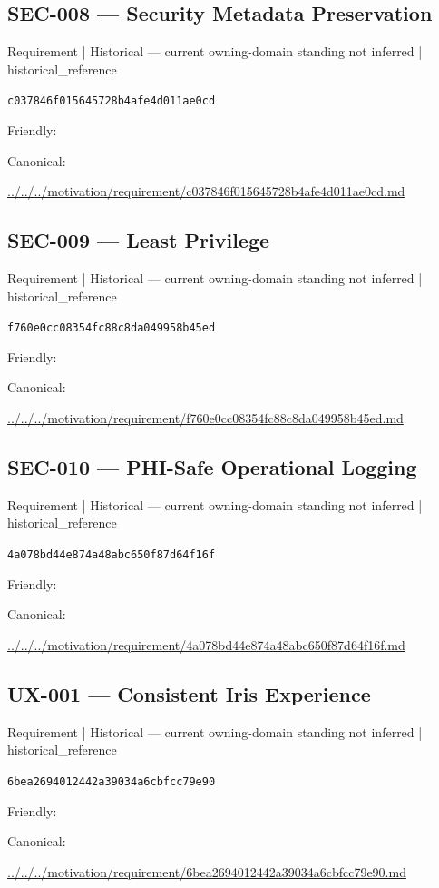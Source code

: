 \documentclass[10pt,a4paper]{article}
\begin{document}
\subsection*{SEC-008 — Security Metadata Preservation}
{\small Requirement | Historical — current owning-domain standing not inferred | historical\_reference}\par
\texttt{c037846f015645728b4afe4d011ae0cd}\par
Friendly: \par
Canonical: \par
{\footnotesize\url{../../../motivation/requirement/c037846f015645728b4afe4d011ae0cd.md}}\par
\subsection*{SEC-009 — Least Privilege}
{\small Requirement | Historical — current owning-domain standing not inferred | historical\_reference}\par
\texttt{f760e0cc08354fc88c8da049958b45ed}\par
Friendly: \par
Canonical: \par
{\footnotesize\url{../../../motivation/requirement/f760e0cc08354fc88c8da049958b45ed.md}}\par
\subsection*{SEC-010 — PHI-Safe Operational Logging}
{\small Requirement | Historical — current owning-domain standing not inferred | historical\_reference}\par
\texttt{4a078bd44e874a48abc650f87d64f16f}\par
Friendly: \par
Canonical: \par
{\footnotesize\url{../../../motivation/requirement/4a078bd44e874a48abc650f87d64f16f.md}}\par
\subsection*{UX-001 — Consistent Iris Experience}
{\small Requirement | Historical — current owning-domain standing not inferred | historical\_reference}\par
\texttt{6bea2694012442a39034a6cbfcc79e90}\par
Friendly: \par
Canonical: \par
{\footnotesize\url{../../../motivation/requirement/6bea2694012442a39034a6cbfcc79e90.md}}\par
\end{document}
